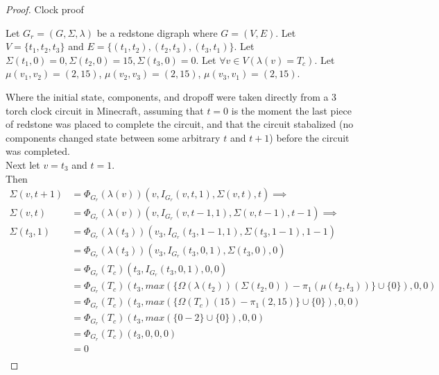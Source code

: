 \documentclass{article}
\begin{document}
\begin{proof} Clock proof
	
	\begin{outline}
		\1 Let \(G_{r} = (G, \Sigma, \lambda)\) be a redstone digraph where \(G = (V, E)\). 
		\1 Let \(V = \{t_{1}, t_{2}, t_{3}\}\) and \(E = \{(t_{1}, t_{2}), (t_{2}, t_{3}), (t_{3}, t_{1})\}\).
		\1 Let \(\Sigma(t_{1}, 0) = 0, \Sigma(t_{2}, 0) = 15, \Sigma(t_{3}, 0) = 0\).
		\1 Let \(\forall v \in V(\lambda(v) = T_{c})\).
		\1 Let \(\mu(v_{1}, v_{2}) = (2, 15)\), \(\mu(v_{2}, v_{3}) = (2, 15)\), \(\mu(v_{3}, v_{1}) = (2, 15)\).
	\end{outline}

	Where the initial state, components, and dropoff were taken directly from a 3 torch clock circuit in Minecraft, assuming
	that \(t = 0\) is the moment the last piece of redstone was placed to complete the circuit, and that the circuit stabalized
	(no components changed state between some arbitrary \(t\) and \(t + 1\)) before the circuit was completed. \\
	Next let \(v = t_{3}\) and \(t = 1\). \\
	Then
	\begin{align*}
		\Sigma(v, t + 1) &= \Phi_{G_{r}}(\lambda(v))(v, I_{G_{r}}(v, t, 1), \Sigma(v, t), t) \implies \\
		\Sigma(v, t) &= \Phi_{G_{r}}(\lambda(v))(v, I_{G_{r}}(v, t - 1, 1), \Sigma(v, t - 1), t - 1) \implies \\
		\Sigma(t_{3}, 1) &= \Phi_{G_{r}}(\lambda(t_{3}))(v_{3}, I_{G_{r}}(t_{3}, 1 - 1, 1), \Sigma(t_{3}, 1 - 1), 1 - 1)\\
						 &= \Phi_{G_{r}}(\lambda(t_{3}))(v_{3}, I_{G_{r}}(t_{3}, 0, 1), \Sigma(t_{3}, 0), 0) \\
						 &= \Phi_{G_{r}}(T_{c})(t_{3}, I_{G_{r}}(t_{3}, 0, 1), 0, 0) \\
						 &= \Phi_{G_{r}}(T_{c})(t_{3}, max(\{\Omega(\lambda(t_{2}))(\Sigma(t_{2}, 0)) - \pi_{1}(\mu(t_{2}, t_{3}))\} \cup \{0\}), 0, 0) \\
						 &= \Phi_{G_{r}}(T_{c})(t_{3}, max(\{\Omega(T_{c})(15) - \pi_{1}(2, 15)\} \cup \{0\}), 0, 0) \\
						 &= \Phi_{G_{r}}(T_{c})(t_{3}, max(\{0 - 2\} \cup \{0\}), 0, 0) \\
						 &= \Phi_{G_{r}}(T_{c})(t_{3}, 0, 0, 0) \\
						 &= 0 \\
	\end{align*}


\end{proof}
\end{document}
